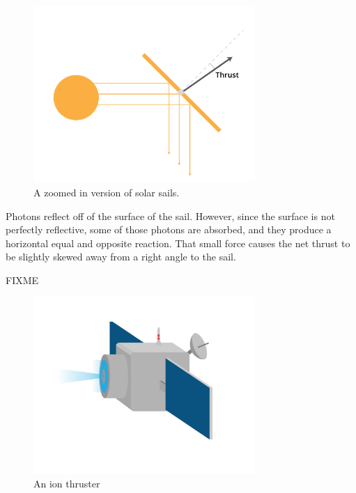 \begin{figure}[htbp]
    \centering
	\includegraphics[width=0.75\textwidth]{solarSailDiagram.png}
    \caption{A zoomed in version of solar sails.}
    \label{fig:solarSail}
\end{figure}

Photons reflect off of the surface of the sail. However, since the surface is not perfectly reflective, some of those photons are absorbed, and they produce a horizontal equal and opposite reaction. That small force causes the net thrust to be slightly skewed away from a right angle to the sail.

  FIXME


\begin{figure}[htbp]
    \centering
	\includegraphics[width=0.75\textwidth]{ionThruster.png}
    \caption{An ion thruster}
    \label{fig:ionThruster}
\end{figure}





